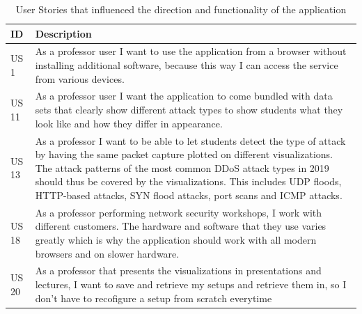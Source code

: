 \begin{table}[]
\centering
\begin{tabular}{|p{1.1cm}|p{12cm}|}
\hline
\textbf{ID} & \textbf{Description} \\ \hline

US 1         & As a professor user I want to use the application from a browser without installing additional software, because this way I can access the service from various devices.\\ \hline
US 11        & As a professor user I want the application to come bundled with data sets that clearly show different attack types to show students what they look like and how they differ in appearance.\\ \hline
US 13        & As a professor I want to be able to let students detect the type of attack by having the same packet capture plotted on different visualizations. The attack patterns of the most common DDoS attack types in 2019 should thus be covered by the visualizations\footnotemark. This includes UDP floods, HTTP-based attacks, SYN flood attacks, port scans and ICMP attacks.\\ \hline
US 18       & As a professor performing network security workshops, I work with different customers. The hardware and software that they use varies greatly which is why the application should work with all modern browsers and on slower hardware.\\ \hline
US 20      & As a professor that presents the visualizations in presentations and lectures, I want to save and retrieve my setups and retrieve them in, so I don't have to recofigure a setup from scratch everytime\\ \hline

\end{tabular}
\caption{User Stories that influenced the direction and functionality of the application}
\label{table:1}
\end{table} 



